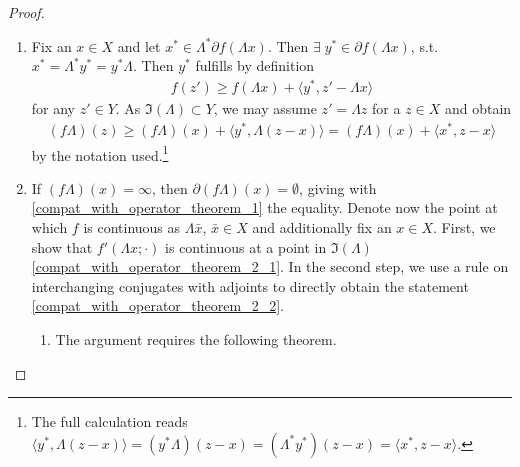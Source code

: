 \documentclass[10pt, leqno]{amsart}
\theoremstyle{definition}
\theoremstyle{remark}
\newcommand{\draftcommentdone}{}
\begin{document}
    \begin{proof}
        \begin{enumerate}[label=(\roman*), wide]
            \item[\ref{compat_with_operator_theorem_1}] \draftcommentdone Fix an \(x \in X\) and let \(x^* \in \Lambda^*\partial f(\Lambda x)\). Then \(\exists \; y^* \in \partial f(\Lambda x)\), s.t. \(x^* = \Lambda^* y^* = y^* \Lambda\). Then \(y^*\) fulfills by definition
            \begin{align}
                f(z') \geq f(\Lambda x) + \langle y^*, z'-\Lambda x \rangle
            \end{align}
            for any \(z' \in Y\). As \(\Im(\Lambda) \subset Y\), we may assume \(z' = \Lambda z\) for a \(z \in X\) and obtain
            \begin{align}
                (f \Lambda)(z) \geq (f \Lambda)(x) + \langle y^*, \Lambda (z - x) \rangle = (f \Lambda)(x) + \langle x^*, z - x \rangle
            \end{align}
            by the notation used.\footnote{The full calculation reads \(\langle y^*, \Lambda (z-x) \rangle = (y^* \Lambda) (z-x) = (\Lambda^* y^*) (z-x) = \langle x^*, z-x \rangle\).}
            \item[\ref{compat_with_operator_theorem_2}] \draftcommentdone If \((f\Lambda)(x) = \infty\), then \(\partial (f\Lambda)(x) = \emptyset\), giving with \ref{compat_with_operator_theorem_1} the equality. Denote now the point at which \(f\) is continuous as \(\Lambda \bar{x}\), \(\bar{x} \in X\) and additionally fix an \(x \in X\). First, we show that \(f'(\Lambda x; \cdot)\) is continuous at a point in \(\Im(\Lambda)\) \ref{compat_with_operator_theorem_2_1}. In the second step, we use a rule on interchanging conjugates with adjoints to directly obtain the statement \ref{compat_with_operator_theorem_2_2}.
            
            \begin{enumerate}[label=(\alph*), wide]
                \item \label{compat_with_operator_theorem_2_1} The argument requires the following theorem.
                

\end{enumerate}
\end{enumerate}
\end{proof}
\end{document}
